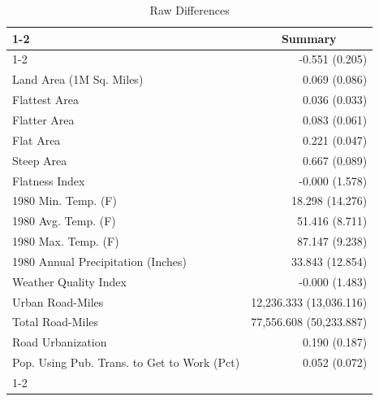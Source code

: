 \begin{table}[!h]
\caption{Raw Differences}
\centering
\begin{tabular}{ll}
\cline{1-2}
\multicolumn{1}{r}{} &
  \multicolumn{1}{c}{Summary} \\
\cline{1-2}
\multicolumn{1}{l}{Elasticity (Table 9)} &
  \multicolumn{1}{r}{-0.551 (0.205)} \\
\multicolumn{1}{l}{Land Area (1M Sq. Miles)} &
  \multicolumn{1}{r}{0.069 (0.086)} \\
\multicolumn{1}{l}{Flattest Area} &
  \multicolumn{1}{r}{0.036 (0.033)} \\
\multicolumn{1}{l}{Flatter Area} &
  \multicolumn{1}{r}{0.083 (0.061)} \\
\multicolumn{1}{l}{Flat Area} &
  \multicolumn{1}{r}{0.221 (0.047)} \\
\multicolumn{1}{l}{Steep Area} &
  \multicolumn{1}{r}{0.667 (0.089)} \\
\multicolumn{1}{l}{Flatness Index} &
  \multicolumn{1}{r}{-0.000 (1.578)} \\
\multicolumn{1}{l}{1980 Min. Temp. (F)} &
  \multicolumn{1}{r}{18.298 (14.276)} \\
\multicolumn{1}{l}{1980 Avg. Temp. (F)} &
  \multicolumn{1}{r}{51.416 (8.711)} \\
\multicolumn{1}{l}{1980 Max. Temp. (F)} &
  \multicolumn{1}{r}{87.147 (9.238)} \\
\multicolumn{1}{l}{1980 Annual Precipitation (Inches)} &
  \multicolumn{1}{r}{33.843 (12.854)} \\
\multicolumn{1}{l}{Weather Quality Index} &
  \multicolumn{1}{r}{-0.000 (1.483)} \\
\multicolumn{1}{l}{Urban Road-Miles} &
  \multicolumn{1}{r}{12,236.333 (13,036.116)} \\
\multicolumn{1}{l}{Total Road-Miles} &
  \multicolumn{1}{r}{77,556.608 (50,233.887)} \\
\multicolumn{1}{l}{Road Urbanization} &
  \multicolumn{1}{r}{0.190 (0.187)} \\
\multicolumn{1}{l}{Pop. Using Pub. Trans. to Get to Work (Pct)} &
  \multicolumn{1}{r}{0.052 (0.072)} \\
\cline{1-2}
\end{tabular}
\end{table}
